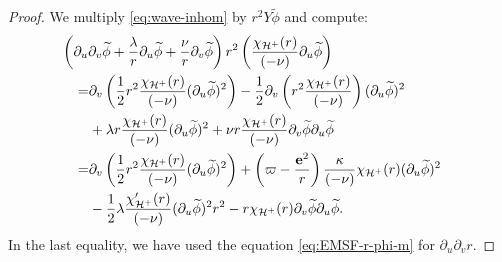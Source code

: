 \documentclass[10pt, reqno]{amsart}
\theoremstyle{definition}
\theoremstyle{remark}
\theoremstyle{conjecture}
\numberwithin{equation}{section}
\newcommand{\rd}{\partial}
\newcommand{\0}{\emptyset}
\newcommand{\kpp}{\kappa}
\newcommand{\lmb}{\lambda}
\newcommand{\bfe}{{\bf e}}
\newcommand{\calH}{\mathcal H}
\newcommand{\dur}{\nu}
\newcommand{\dvr}{\lmb}
\newcommand{\EH}{\calH^{+}}
\newcommand{\e}{\bfe}							%
\newcommand{\phibg}{\overline{\phi}}				%
\newcommand{\phidf}{\widetilde{\phi}}				%
\begin{document}
\begin{proof}
We multiply \eqref{eq:wave-inhom} by $r^{2} Y \phidf$ and compute:
\begin{align*}
& \hskip-2em
	\left(\rd_{u} \rd_{v} \phidf + \frac{\dvr}{r} \rd_{u} \phidf + \frac{\dur}{r} \rd_{v} \phidf \right) r^{2} \left( \frac{\chi_{\EH}(r)}{(-\dur)} \rd_{u} \phidf \right) \\
	= & \rd_{v} \left( \frac{1}{2} r^{2} \frac{\chi_{\EH}(r)}{(-\dur)} (\rd_{u} \phidf)^{2} \right)
		- \frac{1}{2} \rd_{v} \left(r^{2} \frac{\chi_{\EH}(r)}{(-\dur)} \right) (\rd_{u} \phidf)^{2} \\
	& + \dvr r \frac{\chi_{\EH}(r)}{(-\dur)} (\rd_{u} \phidf)^{2} + \dur r \frac{\chi_{\EH}(r)}{(-\dur)} \rd_{v} \phidf \rd_{u} \phidf \\
	= & \rd_{v} \left( \frac{1}{2} r^{2} \frac{\chi_{\EH}(r)}{(-\dur)} (\rd_{u} \phidf)^{2} \right) + \left( \varpi - \frac{\e^{2}}{r}\right) \frac{\kpp}{(-\dur)} \chi_{\EH}(r) (\rd_{u} \phidf)^{2} \\
	& - \frac{1}{2} \dvr  \frac{\chi_{\EH}'(r)}{(-\dur)} (\rd_{u} \phidf)^{2} r^{2}
	- r \chi_{\EH}(r) \rd_{v} \phidf \rd_{u} \phidf.
\end{align*}
In the last equality, we have used the equation \eqref{eq:EMSF-r-phi-m} for $\rd_{u} \rd_{v} r$. \qedhere
\end{proof}
\end{document}
